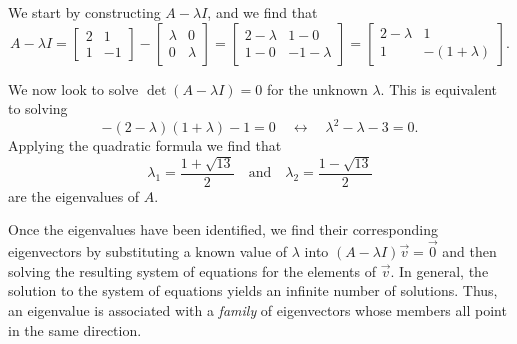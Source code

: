 \documentclass[../book.tex]{subfiles}
\begin{document}
\begin{solution}
We start by constructing \(A - \lambda  I\), and we find that
\begin{equation}\label{eq:eig-8}
A - \lambda I
=
\begin{bmatrix}
  2 & 1 \\
  1 &-1
\end{bmatrix}
-
\begin{bmatrix}
  \lambda & 0 \\ 0 & \lambda
\end{bmatrix}
=
\begin{bmatrix}
  2 - \lambda & 1 - 0 \\
  1 - 0 & -1 - \lambda
\end{bmatrix}
=
\begin{bmatrix}
  2 - \lambda & 1 \\
  1 & -(1 + \lambda)
\end{bmatrix}.
\end{equation}



We now look to solve \(\det (A-\lambda I) = 0\) for the unknown \(\lambda\). This is equivalent to solving
\begin{equation}\label{eq:eig-9}
-(2-\lambda)(1+\lambda) - 1 = 0
\quad\leftrightarrow\quad
\lambda^2 - \lambda - 3 = 0 .
\end{equation}
Applying the quadratic formula we find that
\begin{equation}\label{eq:eig-10}
\lambda_1
=
\frac{1 + \sqrt{13}}{2}
\quad
\text{and}
\quad
\lambda_2
=
\frac{1 - \sqrt{13}}{2}
\end{equation}
are the eigenvalues of \(A\).
\end{solution}

Once the eigenvalues have been identified, we find their corresponding eigenvectors by substituting a known value of \(\lambda\) into \((A - \lambda I) \vec{v} = \vec{0}\) and then solving the resulting system of equations for the elements of \(\vec{v}\). In general, the solution to the system of equations yields an infinite number of solutions. Thus, an eigenvalue is associated with a \emph{family} of eigenvectors whose members all point in the same direction.
\end{document}
